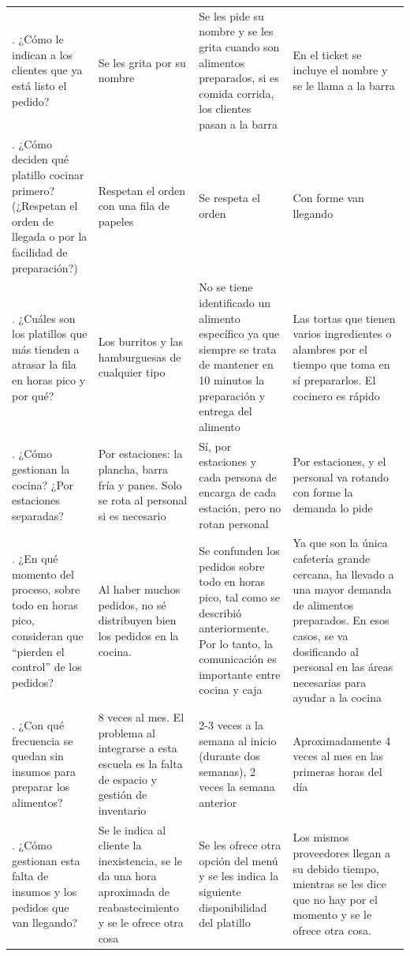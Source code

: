 \begin{longtable}[c]{p{3cm} p{4cm} p{4cm} p{4cm}}
\addlinespace
6. ¿Cómo le indican a los clientes que ya está listo el pedido? & Se les grita por su nombre & Se les pide su nombre y se les grita cuando son alimentos preparados, si es comida corrida, los clientes pasan a la barra & En el ticket se incluye el nombre y se le llama a la barra \\
\addlinespace
7. ¿Cómo deciden qué platillo cocinar primero? (¿Respetan el orden de llegada o por la facilidad de preparación?) & Respetan el orden con una fila de papeles & Se respeta el orden & Con forme van llegando \\
\addlinespace
8. ¿Cuáles son los platillos que más tienden a atrasar la fila en horas pico y por qué? & Los burritos y las hamburguesas de cualquier tipo & No se tiene identificado un alimento específico ya que siempre se trata de mantener en 10 minutos la preparación y entrega del alimento & Las tortas que tienen varios ingredientes o alambres por el tiempo que toma en sí prepararlos. El cocinero es rápido \\
\addlinespace
9. ¿Cómo gestionan la cocina? ¿Por estaciones separadas? & Por estaciones: la plancha, barra fría y panes. Solo se rota al personal si es necesario & Sí, por estaciones y cada persona de encarga de cada estación, pero no rotan personal & Por estaciones, y el personal va rotando con forme la demanda lo pide \\
\addlinespace
10. ¿En qué momento del proceso, sobre todo en horas pico, consideran que ``pierden el control'' de los pedidos? & Al haber muchos pedidos, no sé distribuyen bien los pedidos en la cocina. & Se confunden los pedidos sobre todo en horas pico, tal como se describió anteriormente. Por lo tanto, la comunicación es importante entre cocina y caja & Ya que son la única cafetería grande cercana, ha llevado a una mayor demanda de alimentos preparados. En esos casos, se va dosificando al personal en las áreas necesarias para ayudar a la cocina \\
\addlinespace
11. ¿Con qué frecuencia se quedan sin insumos para preparar los alimentos? & 8 veces al mes. El problema al integrarse a esta escuela es la falta de espacio y gestión de inventario & 2-3 veces a la semana al inicio (durante dos semanas), 2 veces la semana anterior & Aproximadamente 4 veces al mes en las primeras horas del día \\
\addlinespace
12. ¿Cómo gestionan esta falta de insumos y los pedidos que van llegando? & Se le indica al cliente la inexistencia, se le da una hora aproximada de reabastecimiento y se le ofrece otra cosa & Se les ofrece otra opción del menú y se les indica la siguiente disponibilidad del platillo & Los mismos proveedores llegan a su debido tiempo, mientras se les dice que no hay por el momento y se le ofrece otra cosa. \\

\end{longtable}
